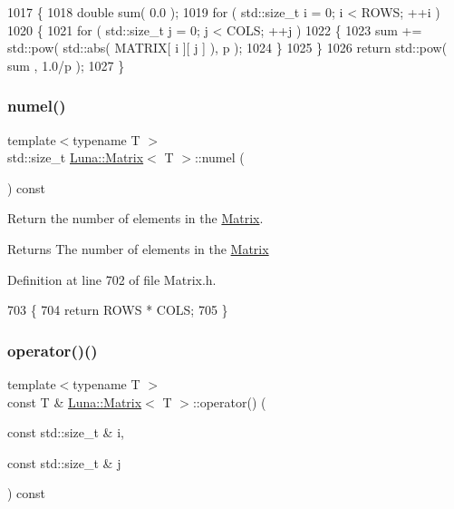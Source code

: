 \begin{DoxyCode}
1017   \{
1018     \textcolor{keywordtype}{double} sum( 0.0 );
1019     \textcolor{keywordflow}{for} ( std::size\_t i = 0; i < ROWS; ++i )
1020     \{
1021         \textcolor{keywordflow}{for} ( std::size\_t j = 0; j < COLS; ++j )
1022         \{
1023             sum += std::pow( std::abs( MATRIX[ i ][ j ] ), p );
1024         \}
1025     \}
1026     \textcolor{keywordflow}{return} std::pow( sum , 1.0/p );
1027   \}
\end{DoxyCode}
\mbox{\label{classLuna_1_1Matrix_a2e697f673d6bc9b38dc1a07bac56aac5}} 
\subsubsection{\texorpdfstring{numel()}{numel()}}
{\footnotesize\ttfamily template$<$typename T $>$ \\
std\+::size\+\_\+t \hyperlink{classLuna_1_1Matrix}{Luna\+::\+Matrix}$<$ T $>$\+::numel (\begin{DoxyParamCaption}{ }\end{DoxyParamCaption}) const\hspace{0.3cm}{\ttfamily [inline]}}



Return the number of elements in the \hyperlink{classLuna_1_1Matrix}{Matrix}. 

\begin{DoxyReturn}{Returns}
The number of elements in the \hyperlink{classLuna_1_1Matrix}{Matrix} 
\end{DoxyReturn}


Definition at line 702 of file Matrix.\+h.


\begin{DoxyCode}
703   \{
704     \textcolor{keywordflow}{return} ROWS * COLS;
705   \}
\end{DoxyCode}
\mbox{\label{classLuna_1_1Matrix_ac451a0b396f3382e0b16ad3e95208960}} 
\subsubsection{\texorpdfstring{operator()()}{operator()()}\hspace{0.1cm}{\footnotesize\ttfamily [1/2]}}
{\footnotesize\ttfamily template$<$typename T $>$ \\
const T \& \hyperlink{classLuna_1_1Matrix}{Luna\+::\+Matrix}$<$ T $>$\+::operator() (\begin{DoxyParamCaption}\item[{const std\+::size\+\_\+t \&}]{i,  }\item[{const std\+::size\+\_\+t \&}]{j }\end{DoxyParamCaption}) const\hspace{0.3cm}{\ttfamily [inline]}}



